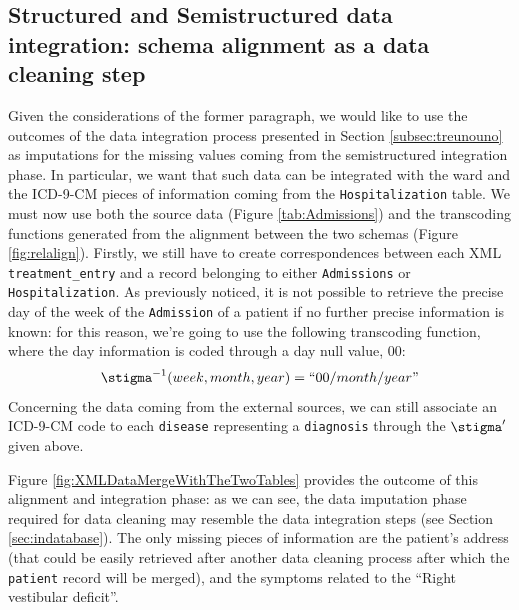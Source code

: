 \subsection{Structured and Semistructured data integration: schema alignment as a data cleaning step}\label{subsec:datacleaningintegrate}
Given the considerations of the former paragraph, we would like to use the outcomes of the data integration process presented in Section \ref{subsec:treunouno} as imputations for 
the missing values coming from the semistructured  integration phase. In particular, we want that such data can be integrated with the ward and the ICD-9-CM pieces of information coming from the \texttt{Hospitalization} table.
We must now use both the source data (Figure \vref{tab:Admissions}) and the transcoding functions generated from the alignment between the two schemas (Figure \vref{fig:relalign}). Firstly, we still have to create correspondences between each XML \texttt{treatment\_entry} and a record belonging to either \texttt{Admissions} or \texttt{Hospitalization}. 
As previously noticed, it is not possible to retrieve the precise day of the week of the \texttt{Admission} of a patient if no further precise information is known: for this reason, we're going to use the following transcoding function, where the day information is coded through a day null value, $00$:
\begin{equation*}
\transcoding^{-1}(week,month,year)=\textup{``}00/month/year\textup{''}
\end{equation*}
Concerning the data coming from the external sources, we can still associate  an ICD-9-CM code to each \texttt{disease} representing a \texttt{diagnosis} through the  $\transcoding'$ given above.

Figure \ref{fig:XMLDataMergeWithTheTwoTables} provides the outcome of this alignment and integration phase: as we can see, the data imputation phase required for data cleaning may resemble the data integration steps (see Section \ref{sec:indatabase}). The only missing pieces of information are the patient's address (that could be easily retrieved after another data cleaning process after which the \texttt{patient} record will be merged), and the symptoms related to the ``Right vestibular deficit''. 

